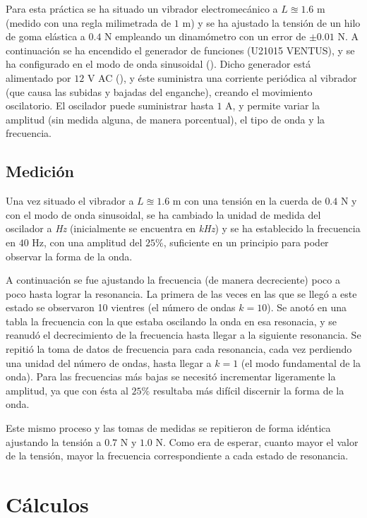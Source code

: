 \documentclass[fleqn,usenatbib,openbib]{mnras}
\begin{document}
Para esta práctica se ha situado un vibrador electromecánico a $L\approxeq 1.6$ m (medido con una regla milimetrada de $1$ m) y se ha ajustado la tensión de un hilo de goma elástica a $0.4$ N empleando un dinamómetro con un error de $\pm 0.01$ N. A continuación se ha encendido el generador de funciones (U21015 VENTUS), y se ha configurado en el modo de onda sinusoidal (\cite{osc}). Dicho generador está alimentado por $12$ V AC (\cite{labuam}), y éste suministra una corriente periódica al vibrador (que causa las subidas y bajadas del enganche), creando el movimiento oscilatorio. El oscilador puede suministrar hasta $1$ A, y permite variar la amplitud (sin medida alguna, de manera porcentual), el tipo de onda y la frecuencia. 

\subsection{Medición}

Una vez situado el vibrador a $L\approxeq 1.6$ m con una tensión en la cuerda de $0.4$ N y con el modo de onda sinusoidal, se ha cambiado la unidad de medida del oscilador a \textit{Hz} (inicialmente se encuentra en \textit{kHz}) y se ha establecido la frecuencia en $40$ Hz, con una amplitud del $25\%$, suficiente en un principio para poder observar la forma de la onda.

A continuación se fue ajustando la frecuencia (de manera decreciente) poco a poco hasta lograr la resonancia. La primera de las veces en las que se llegó a este estado se observaron 10 vientres (el número de ondas $k=10$). Se anotó en una tabla la frecuencia con la que estaba oscilando la onda en esa resonacia, y se reanudó el decrecimiento de la frecuencia hasta llegar a la siguiente resonancia. Se repitió la toma de datos de frecuencia para cada resonancia, cada vez perdiendo una unidad del número de ondas, hasta llegar a $k=1$ (el modo fundamental de la onda). Para las frecuencias más bajas se necesitó incrementar ligeramente la amplitud, ya que con ésta al $25\%$ resultaba más difícil discernir la forma de la onda.

Este mismo proceso y las tomas de medidas se repitieron de forma idéntica ajustando la tensión a $0.7$ N y $1.0$ N. Como era de esperar, cuanto mayor el valor de la tensión, mayor la frecuencia correspondiente a cada estado de resonancia.



\section{Cálculos}
\end{document}
